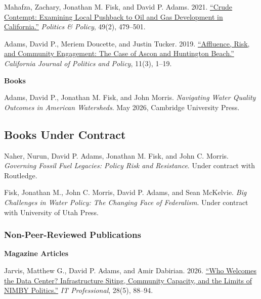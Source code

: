 \documentclass[11pt,letterpaper]{article}
\renewenvironment{itemize}{
  \begin{list}{}{
    \setlength{\leftmargin}{1.5em}
    \setlength{\itemsep}{0.25em}
    \setlength{\parskip}{0pt}
    \setlength{\parsep}{0.25em}
  }
}{
  \end{list}
}
\begin{document}
\begin{itemize}
    \item Mahafza, Zachary, Jonathan M. Fisk, and David P. Adams. 2021. \href{https://doi.org/10.1111/polp.12401}{``Crude Contempt: Examining Local Pushback to Oil and Gas Development in California.''} \emph{Politics \& Policy}, 49(2), 479--501.

    \item Adams, David P., Meriem Doucette, and Justin Tucker. 2019. \href{https://escholarship.org/uc/item/2mz2n6qk}{``Affluence, Risk, and Community Engagement: The Case of Ascon and Huntington Beach.''} \emph{California Journal of Politics and Policy}, 11(3), 1--19.

\end{itemize}

\textbf{Books}
\begin{itemize}\leftmargin=2pt\itemindent=-15pt
  \item Adams, David P., Jonathan M. Fisk, and John Morris. \emph{Navigating Water Quality Outcomes in American Watersheds}. May 2026, Cambridge University Press.
\end{itemize}

\subsection*{Books Under Contract}

\begin{itemize}\leftmargin=2pt\itemindent=-15pt
  \item Naher, Nurun, David P. Adams, Jonathan M. Fisk, and John C. Morris. \emph{Governing Fossil Fuel
  Legacies: Policy Risk and Resistance}. Under contract with Routledge.

  \item Fisk, Jonathan M., John C. Morris, David P. Adams, and Sean McKelvie. \emph{Big Challenges in Water Policy: The Changing Face of Federalism}. Under contract with University of Utah Press.
\end{itemize}

\subsubsection*{Non-Peer-Reviewed Publications}

\textbf{Magazine Articles}
\begin{itemize}\leftmargin=2pt\itemindent=-15pt
    \item Jarvis, Matthew G., David P. Adams, and Amir Dabirian. 2026. \href{https://doi.org/10.1109/MITP.2026.3732817}{``Who Welcomes the Data Center? Infrastructure Siting, Community Capacity, and the Limits of NIMBY Politics.''} \emph{IT Professional}, 28(5), 88--94.
\end{itemize}
\end{document}
